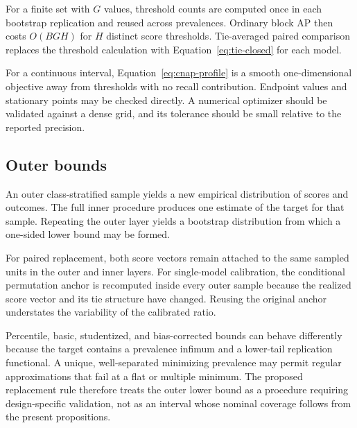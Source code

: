 \documentclass[11pt]{article}
\theoremstyle{remark}
\begin{document}
For a finite set with $G$ values, threshold counts are computed once in each bootstrap replication and reused across prevalences. Ordinary block AP then costs $O(BGH)$ for $H$ distinct score thresholds. Tie-averaged paired comparison replaces the threshold calculation with Equation~\eqref{eq:tie-closed} for each model.

For a continuous interval, Equation~\eqref{eq:cnap-profile} is a smooth one-dimensional objective away from thresholds with no recall contribution. Endpoint values and stationary points may be checked directly. A numerical optimizer should be validated against a dense grid, and its tolerance should be small relative to the reported precision.

\subsection{Outer bounds}

An outer class-stratified sample yields a new empirical distribution of scores and outcomes. The full inner procedure produces one estimate of the target for that sample. Repeating the outer layer yields a bootstrap distribution from which a one-sided lower bound may be formed.

For paired replacement, both score vectors remain attached to the same sampled units in the outer and inner layers. For single-model calibration, the conditional permutation anchor is recomputed inside every outer sample because the realized score vector and its tie structure have changed. Reusing the original anchor understates the variability of the calibrated ratio.

Percentile, basic, studentized, and bias-corrected bounds can behave differently because the target contains a prevalence infimum and a lower-tail replication functional. A unique, well-separated minimizing prevalence may permit regular approximations that fail at a flat or multiple minimum. The proposed replacement rule therefore treats the outer lower bound as a procedure requiring design-specific validation, not as an interval whose nominal coverage follows from the present propositions.
\end{document}
